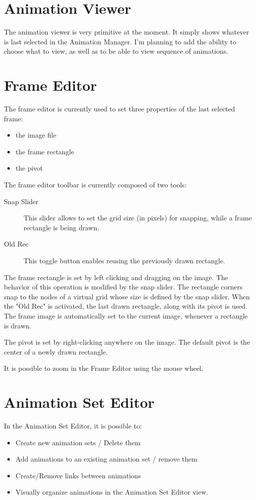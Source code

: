 \documentclass{article}
\begin{document}
\section{Animation Viewer}
The animation viewer is very primitive at the moment. It simply shows whatever is last selected in the Animation Manager. I'm planning to add the ability to choose
what to view, as well as to be able to view sequence of animations.

\section{Frame Editor}
The frame editor is currently used to set three properties of the last selected frame:
\begin{itemize}
\item the image file
\item the frame rectangle
\item the pivot
\end{itemize}

The frame editor toolbar is currently composed of two tools:
\begin{description}
\item[Snap Slider] This slider allows to set the grid size (in pixels) for snapping, while a frame rectangle is being drawn.
\item[Old Rec]	This toggle button enables reusing the previously drawn rectangle.
\end{description}

The frame rectangle is set by left clicking and dragging on the image. The behavior of this operation is modified by the snap slider. The rectangle corners snap to
the nodes of a virtual grid whose size is defined by the snap slider. When the "Old Rec" is activated, the last drawn rectangle, along with its pivot is used. The frame
image is automatically set to the current image, whenever a rectangle is drawn.

The pivot is set by right-clicking anywhere on the image. The default pivot is the center of a newly drawn rectangle.

It is possible to zoom in the Frame Editor using the mouse wheel.

\section{Animation Set Editor}

In the Animation Set Editor, it is possible to:
\begin{itemize}
\item Create new animation sets / Delete them
\item Add animations to an existing animation set / remove them
\item Create/Remove links between animations
\item Visually organize animations in the Animation Set Editor view.
\end{itemize}
\end{document}

